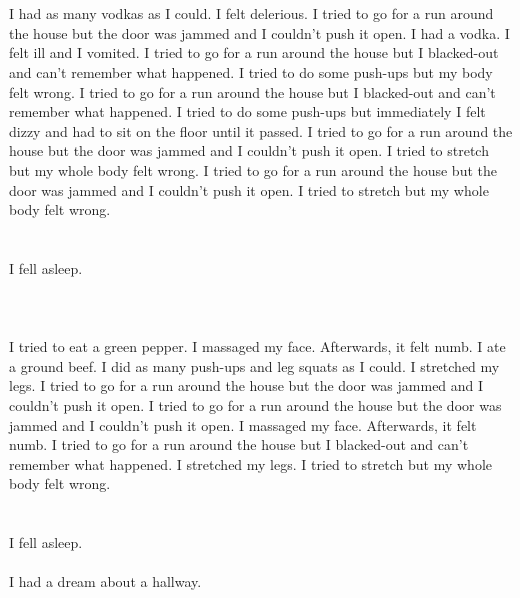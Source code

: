 \documentclass{article}
\begin{document}
    \section{}
    I had as many vodkas as I could. I felt delerious. I tried to go for a run around the house but the door was jammed and I couldn't push it open. I had a vodka. I felt ill and I vomited.  I tried to go for a run around the house but I blacked-out and can't remember what happened.  I tried to do some push-ups but my body felt wrong.  I tried to go for a run around the house but I blacked-out and can't remember what happened.  I tried to do some push-ups but immediately I felt dizzy and had to sit on the floor until it passed.   I tried to go for a run around the house but the door was jammed and I couldn't push it open.  I tried to stretch but my whole body felt wrong.  I tried to go for a run around the house but the door was jammed and I couldn't push it open.  I tried to stretch but my whole body felt wrong.  
    \newpage
    
    \section{}
    I fell asleep.\\\\ 
    \newpage
    
    \section{}
    I tried to eat a green pepper. I massaged my face. Afterwards, it felt numb. I ate a ground beef.  I did as many push-ups and leg squats as I could.  I stretched my legs.  I tried to go for a run around the house but the door was jammed and I couldn't push it open.  I tried to go for a run around the house but the door was jammed and I couldn't push it open.   I massaged my face. Afterwards, it felt numb.  I tried to go for a run around the house but I blacked-out and can't remember what happened.  I stretched my legs.  I tried to stretch but my whole body felt wrong.  
    \newpage
    
    \section{}
    I fell asleep.\\\\I had a dream about a hallway.\\\\ 
    \newpage
    
\end{document}
